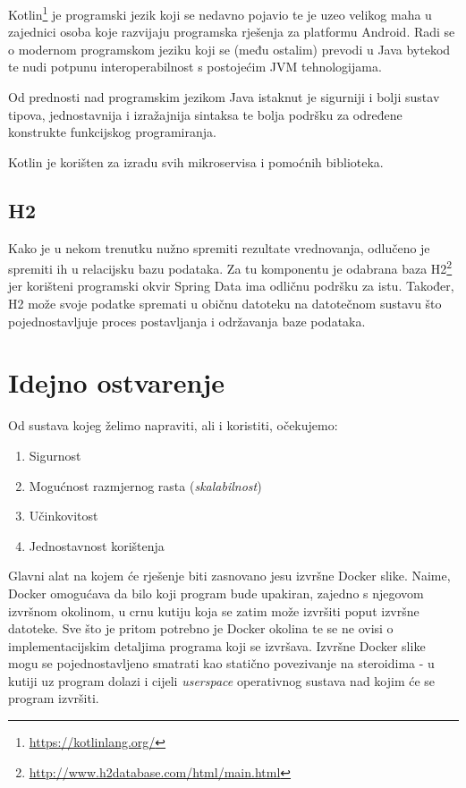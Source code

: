 \documentclass[times, utf8, zavrsni]{fer}
\begin{document}
Kotlin{\footnote{\url{https://kotlinlang.org/}}} je programski jezik koji se nedavno pojavio te je uzeo velikog maha u zajednici osoba koje razvijaju programska rješenja za platformu Android. Radi se o modernom programskom jeziku koji se (među ostalim) prevodi u Java bytekod te nudi potpunu interoperabilnost s postojećim JVM tehnologijama.

Od prednosti nad programskim jezikom Java istaknut je sigurniji i bolji sustav tipova, jednostavnija i izražajnija sintaksa te bolja podršku za određene konstrukte funkcijskog programiranja.

Kotlin je korišten za izradu svih mikroservisa i pomoćnih biblioteka. 

\subsection{H2}

Kako je u nekom trenutku nužno spremiti rezultate vrednovanja, odlučeno je spremiti ih u relacijsku bazu podataka. Za tu komponentu je odabrana baza H2{\footnote{\url{http://www.h2database.com/html/main.html}}} jer korišteni programski okvir Spring Data ima odličnu podršku za istu. Također, H2 može svoje podatke spremati u običnu datoteku na datotečnom sustavu što pojednostavljuje proces postavljanja i održavanja baze podataka.

\section{Idejno ostvarenje}

Od sustava kojeg želimo napraviti, ali i koristiti, očekujemo:

\begin{enumerate}
\item Sigurnost
\item Mogućnost razmjernog rasta (\textit{skalabilnost})
\item Učinkovitost
\item Jednostavnost korištenja
\end{enumerate}

Glavni alat na kojem će rješenje biti zasnovano jesu izvršne Docker slike. Naime, Docker omogućava da bilo koji program bude upakiran, zajedno s njegovom izvršnom okolinom, u crnu kutiju koja se zatim može izvršiti poput izvršne datoteke. Sve što je pritom potrebno je Docker okolina te se ne ovisi o implementacijskim detaljima programa koji se izvršava. Izvršne Docker slike mogu se pojednostavljeno smatrati kao statično povezivanje na steroidima - u kutiji uz program dolazi i cijeli \textit{userspace} operativnog sustava nad kojim će se program izvršiti.
\end{document}
